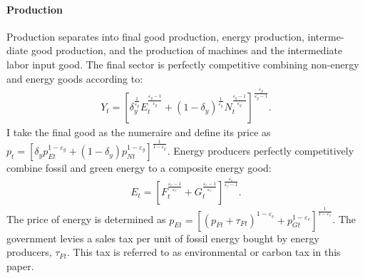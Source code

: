 
\paragraph{Production}
Production separates into final good production, energy production, interme- diate good production, and the production of machines and the intermediate labor input good. 
The final sector is perfectly competitive combining  non-energy and energy goods according to:
\begin{align*}
	Y_t=\left[\delta_y^\frac{1}{\varepsilon_y}E_{t}^{\frac{\varepsilon_y-1}{\varepsilon_y}}+(1-\delta_y)^\frac{1}{\varepsilon_y}N_{t}^{\frac{\varepsilon_y-1}{\varepsilon_y}}\right]^\frac{\varepsilon_y}{\varepsilon_y-1}.
\end{align*} 
I take the final good as the numeraire and define its price as $p_t=\left[\delta_yp_{Et}^{1-\varepsilon_y}+(1-\delta_y)p_{Nt}^{1-\varepsilon_y}\right]^{\frac{1}{1-\varepsilon_y}}$.
Energy producers perfectly competitively combine fossil and green energy to a composite energy good:
\begin{align*}
	E_t=\left[F_t^\frac{\varepsilon_e-1}{\varepsilon_e}+G_t^\frac{\varepsilon_e-1}{\varepsilon_e}\right]^\frac{\varepsilon_e}{\varepsilon_e-1}.
\end{align*}
The price of energy is determined as  $p_{Et}= \left[(p_{Ft}+\tau_{Ft})^{1-\varepsilon_e}+p_{Gt}^{1-\varepsilon_e}\right]^\frac{1}{{1-\varepsilon_e}}$.
The government levies a sales tax per unit of fossil energy bought by energy producers, $\tau_{Ft}$. This tax is referred to as environmental or carbon tax in this paper. 

